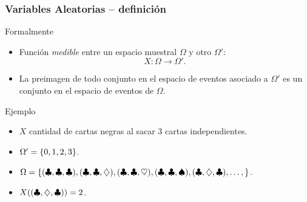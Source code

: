 \documentclass[table]{beamer}
\begin{document}
\begin{frame}
    \frametitle{Variables Aleatorias -- definición}
    \begin{block}{Formalmente}
        \begin{itemize}
            \item Función \emph{medible} entre un espacio muestral $\Omega$ y otro $\Omega'$:
                \begin{equation*}
                    X : \Omega \rightarrow \Omega' .
                \end{equation*}
            \item La preimagen de todo conjunto en el espacio de eventos asociado a $\Omega'$ es un conjunto en el espacio de eventos de $\Omega$.
        \end{itemize}
    \end{block}
    \begin{exampleblock}{Ejemplo}
        \begin{itemize}
            \item $X$ cantidad de cartas negras al sacar 3 cartas independientes.
            \item $\Omega' = \bparens{0, 1, 2, 3}$.
            \item $\Omega = \bparens{\parens{\clubsuit, \clubsuit, \clubsuit},
                    \parens{\clubsuit, \clubsuit, \diamondsuit},
                    \parens{\clubsuit, \clubsuit, \heartsuit},
                    \parens{\clubsuit, \clubsuit, \spadesuit},
                    \parens{\clubsuit, \diamondsuit, \clubsuit},
                    \ldots, }$.
            \item $X \parens{\parens{\clubsuit, \diamondsuit, \clubsuit}} = 2$.
        \end{itemize}
    \end{exampleblock}
\end{frame}
\end{document}
